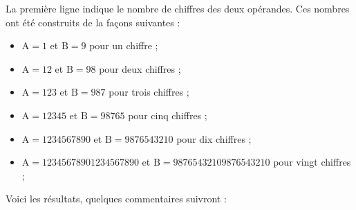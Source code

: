 \documentclass[12pt]{report}
\begin{document}
La première ligne indique le nombre de chiffres des deux
opérandes. Ces nombres ont été construits de la façons suivantes :
\begin{itemize}
\item $\mathrm{A} = 1$ et $\mathrm{B} = 9$ pour un chiffre ;
\item $\mathrm{A} = 12$ et $\mathrm{B} = 98$ pour deux chiffres ;
\item $\mathrm{A} = 123$ et $\mathrm{B} = 987$ pour trois chiffres ;
\item $\mathrm{A} = 12345$ et $\mathrm{B} = 98765$ pour cinq chiffres ;
\item $\mathrm{A} = 1234567890$ et $\mathrm{B} = 9876543210$ pour dix
  chiffres ;
\item $\mathrm{A} = 12345678901234567890$ et $\mathrm{B} =
  98765432109876543210$ pour vingt chiffres ;
\end{itemize}
Voici les résultats, quelques commentaires suivront :
\end{document}
